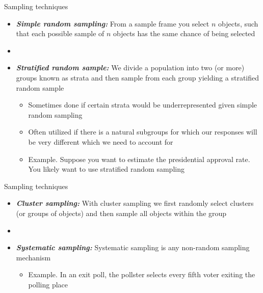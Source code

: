 \documentclass[xcolor=dvipsnames]{beamer}
\begin{document}
\begin{frame}{Sampling techniques}
	\begin{itemize}
		\item \textbf{\emph{Simple random sampling:}} From a sample frame you select $n$ objects, such that each possible sample of $n$ objects has the same chance of being selected \pause
		
		\item[]
		
		\item \textbf{\emph{Stratified random sample:}} We divide a population into two (or more) groups known as strata and then sample from each group yielding a stratified random sample \pause
		\begin{itemize}
			\item Sometimes done if certain strata would be underrepresented given simple random sampling \pause
			\item Often utilized if there is a natural subgroups for which our responses will be very different which we need to account for \pause
			\item Example. Suppose you want to estimate the presidential approval rate. You likely want to use stratified random sampling
		\end{itemize}
	\end{itemize}
\end{frame}

\begin{frame}{Sampling techniques}
\begin{itemize}
	\item \textbf{\emph{Cluster sampling:}} With cluster sampling we first randomly select clusters (or groups of objects) and then sample all objects within the group \pause
	\item[]
	\item \textbf{\emph{Systematic sampling:}} Systematic sampling is any non-random sampling mechanism \pause
	\begin{itemize}
		\item Example. In an exit poll, the pollster selects every fifth voter exiting the polling place 
	\end{itemize}
\end{itemize}
\end{frame}
\end{document}
